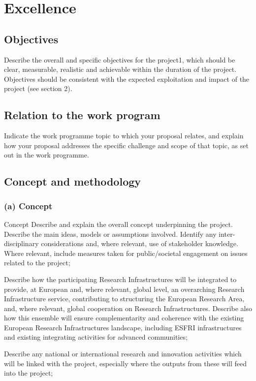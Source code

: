 \chapter{Excellence}



\section{Objectives}

\begin{todo}{}\color{red}
  Describe the overall and specific objectives for the project1, which should be clear, measurable, realistic and achievable within the duration of the project. Objectives should be consistent with the expected exploitation and impact of the project (see section 2).
\end{todo}



\section{Relation to the work program}

\begin{todo}{}\color{red}
  Indicate the work programme topic to which your proposal relates, and explain how your proposal addresses the specific challenge and scope of that topic, as set out in the work programme.
\end{todo}



\section{Concept and methodology}

\subsection*{(a) Concept}

\begin{todo}{Concept}\color{red}
Describe and explain the overall concept underpinning the project. Describe the main ideas, models or assumptions involved. Identify any inter-disciplinary considerations and, where relevant, use of stakeholder knowledge. Where relevant, include measures taken for public/societal engagement on issues related to the project;
  
Describe how the participating Research Infrastructures will be integrated to provide, at European and, where relevant, global level, an overarching Research Infrastructure service, contributing to structuring the European Research Area, and, where relevant, global cooperation on Research Infrastructures. Describe also how this ensemble will ensure complementarity and coherence with the existing European Research Infrastructures landscape, including ESFRI infrastructures and existing integrating activities for advanced communities;

Describe any national or international research and innovation activities which will be linked with the project, especially where the outputs from these will feed into the project;
\end{todo}

